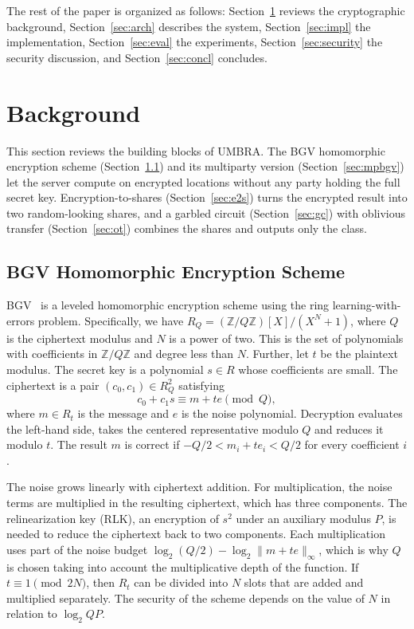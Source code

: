 \documentclass[conference,letterpaper]{IEEEtran}
\begin{document}
The rest of the paper is organized as follows: Section~\ref{sec:background} reviews the cryptographic background, Section~\ref{sec:arch} describes the system, Section~\ref{sec:impl} the implementation, Section~\ref{sec:eval} the experiments, Section~\ref{sec:security} the security discussion, and Section~\ref{sec:concl} concludes.

\section{Background}\label{sec:background}
This section reviews the building blocks of UMBRA. The BGV homomorphic encryption scheme (Section~\ref{sec:bgv}) and its multiparty version (Section~\ref{sec:mpbgv}) let the server compute on encrypted locations without any party holding the full secret key. Encryption-to-shares (Section~\ref{sec:e2s}) turns the encrypted result into two random-looking shares, and a garbled circuit (Section~\ref{sec:gc}) with oblivious transfer (Section~\ref{sec:ot}) combines the shares and outputs only the class.

\subsection{BGV Homomorphic Encryption Scheme}\label{sec:bgv}
BGV~\cite{bgv} is a leveled homomorphic encryption scheme using the ring learning-with-errors problem. Specifically, we have $R_Q = (\mathbb{Z}/Q\mathbb{Z})[X]/(X^N+1)$, where $Q$ is the ciphertext modulus and $N$ is a power of two. This is the set of polynomials with coefficients in $\mathbb{Z}/Q\mathbb{Z}$ and degree less than $N$. Further, let $t$ be the plaintext modulus. The secret key is a polynomial $s \in R$ whose coefficients are small. The ciphertext is a pair $(c_0, c_1) \in R_Q^2$ satisfying
\begin{equation}
c_0 + c_1 s \equiv m + t e \pmod{Q},
\end{equation}
where $m \in R_t$ is the message and $e$ is the noise polynomial. Decryption evaluates the left-hand side, takes the centered representative modulo $Q$ and reduces it modulo $t$. The result $m$ is correct if $-Q/2 < m_i + t e_i < Q/2$ for every coefficient $i$.

The noise grows linearly with ciphertext addition. For multiplication, the noise terms are multiplied in the resulting ciphertext, which has three components. The relinearization key (RLK), an encryption of $s^2$ under an auxiliary modulus $P$, is needed to reduce the ciphertext back to two components. Each multiplication uses part of the noise budget $\log_2(Q/2) - \log_2\|m+te\|_\infty$, which is why $Q$ is chosen taking into account the multiplicative depth of the function. If $t \equiv 1 \pmod{2N}$, then $R_t$ can be divided into $N$ slots that are added and multiplied separately. The security of the scheme depends on the value of $N$ in relation to $\log_2 QP$.
\end{document}
